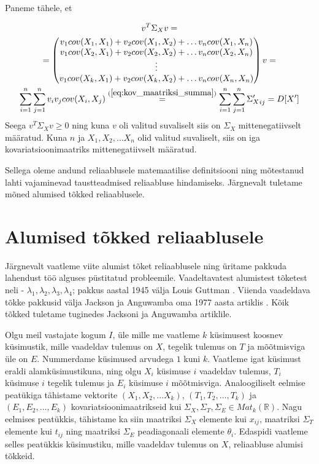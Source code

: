 \documentclass[a4paper,12pt,oneside]{article}
\numberwithin{equation}{section}
\theoremstyle{definition}
\begin{document}
Paneme tähele, et 

\begin{gather*}
v^T \Sigma_X v = \\
= \begin{pmatrix}
v_1 cov(X_1,X_1) + v_2 cov(X_1,X_2) + \hdots v_n cov(X_1,X_n) \\
v_1 cov(X_2,X_1) + v_2 cov(X_2,X_2) + \hdots v_n cov(X_2,X_n) \\
\vdots \\
v_1 cov(X_k,X_1) + v_2 cov(X_k,X_2) + \ldots v_n cov(X_n,X_n) \\
\end{pmatrix} v = \\  \sum \limits_{i=1}^n \sum \limits_{j=1}^n v_i v_j cov(X_i,X_j)  \overset{(\ref{eq:kov_maatriksi_summa})}{=} \sum \limits_{i=1}^n \sum \limits_{j=1}^n {\Sigma_X'}_{ij} = D[X']
\end{gather*}
Seega $v^T \Sigma_X v \geq 0$ ning kuna $v$ oli valitud suvaliselt siis on $\Sigma_X$ mittenegatiivselt määratud. Kuna $n$ ja $X_1,X_2,\ldots X_n$ olid valitud suvaliselt, siis on iga kovariatsioonimaatriks mittenegatiivselt määratud. 

Sellega oleme andund reliaablusele matemaatilise definitsiooni ning mõtestanud lahti vajaminevad taustteadmised reliaabluse hindamiseks. Järgnevalt tuletame mõned alumised tõkked reliaablusele.   

  
\pagebreak


\section{Alumised tõkked reliaablusele}

Järgnevalt vaatleme viite alumist tõket reliaablusele ning üritame pakkuda lahendust töö alguses püstitatud probleemile. Vaadeltavatest alumistest tõketest neli - $\lambda_1,\lambda_2,\lambda_3,\lambda_4$; pakkus aastal 1945 välja Louis Guttman \cite{Guttman1945}. Viienda vaadeldava tõkke pakkusid välja Jackson ja Anguwamba oma 1977 aasta artiklis \cite{Jackson1977}. Kõik tõkked tuletame tuginedes Jacksoni ja Anguwamba artiklile.

Olgu meil vastajate kogum $I$, üle mille me vaatleme $k$ küsimusest koosnev küsimustik, mille vaadeldav tulemus on $X$, tegelik tulemus on $T$ ja mõõtmisviga üle on $E$. Nummerdame küsimused arvudega $1$ kuni $k$. Vaatleme igat küsimust eraldi alamküsimustikuna, ning olgu $X_i$ küsimuse $i$ vaadeldav tulemus, $T_i$ küsimuse $i$ tegelik tulemus ja $E_i$ küsimuse $i$ mõõtmisviga. Analoogiliselt eelmise peatükiga tähistame vektorite $(X_1,X_2,\ldots X_k)$, $(T_1,T_2,\ldots,T_k)$ ja $(E_1,E_2,\ldots,E_k)$ kovariatsioonimaatrikseid kui $\Sigma_X,\Sigma_T,\Sigma_E \in Mat_{k}\left(\mathbb{R}\right)$. Nagu eelmises peatükkis, tähistame ka siin maatriksi $\Sigma_X$ elemente kui $x_{ij}$, maatriksi $\Sigma_T$ elemente kui $t_{ij}$ ning maatriksi $\Sigma_E$ peadiagonaali elemente $\theta_i$. Edaspidi vaatleme selles peatükkis küsimustiku, mille vaadeldav tulemus on $X$, reliaabluse alumisi tõkkeid.
\end{document}

